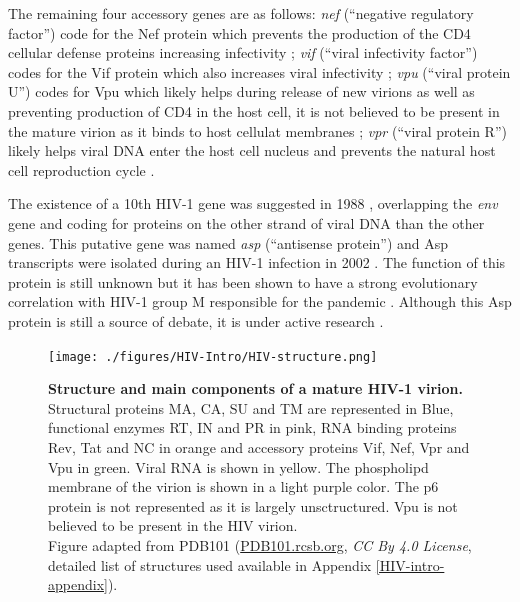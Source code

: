 \documentclass[
  11pt,
  twoside]{scrbook}
\newcommand{\extcaption}[2]{
    \caption[#1]{
        \textbf{#1}\newline
        #2
    }
}
\begin{document}
The remaining four accessory genes are as follows: \emph{nef} (``negative regulatory factor'') code for the Nef protein which prevents the production of the CD4 cellular defense proteins increasing infectivity \autocite{mangasarianMultifacetedRoleHIV1997}; \emph{vif} (``viral infectivity factor'') codes for the Vif protein which also increases viral infectivity \autocite{cohenRoleAuxiliaryProteins1996}; \emph{vpu} (``viral protein U'') codes for Vpu which likely helps during release of new virions \autocite{lambVpuVprHuman1997,cohenRoleAuxiliaryProteins1996} as well as preventing production of CD4 in the host cell, it is not believed to be present in the mature virion as it binds to host cellulat membranes \autocite{khanRoleViralProtein2021}; \emph{vpr} (``viral protein R'') likely helps viral DNA enter the host cell nucleus and prevents the natural host cell reproduction cycle \autocite{emermanHIV1VprCell1996}.

The existence of a 10th HIV-1 gene was suggested in 1988 \autocite{millerHumanImmunodeficiencyVirus1988}, overlapping the \emph{env} gene and coding for proteins on the other strand of viral DNA than the other genes. This putative gene was named \emph{asp} (``antisense protein'') and Asp transcripts were isolated during an HIV-1 infection in 2002 \autocite{briquetImmunolocalizationStudiesAntisense2002}. The function of this protein is still unknown but it has been shown to have a strong evolutionary correlation with HIV-1 group M responsible for the pandemic \autocite{cassanConcomitantEmergenceAntisense2016}. Although this Asp protein is still a source of debate, it is under active research \autocite{savoretPilotStudyHumoral2020}.

\begin{figure}[h]
  \centering
  \texttt{[image: ./figures/HIV-Intro/HIV-structure.png]}
  \extcaption{Structure and main components of a mature HIV-1 virion.}{Structural proteins MA, CA, SU and TM are represented in Blue, functional enzymes RT, IN and PR in pink, RNA binding proteins Rev, Tat and NC in orange and accessory proteins Vif, Nef, Vpr and Vpu in green. Viral RNA is shown in yellow. The phospholipd membrane of the virion is shown in a light purple color. The p6 protein is not represented as it is largely unsctructured. Vpu is not believed to be present in the HIV virion. \\
Figure adapted from PDB101 \autocite{zardecki2022} (\href{https://PDB101.rcsb.org}{PDB101.rcsb.org}, \textit{CC By 4.0 License}, detailed list of structures used available in Appendix \autoref{HIV-intro-appendix}).}
\label{fig:hivStructure}
\end{figure}
\end{document}
